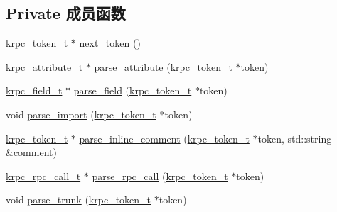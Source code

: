 \subsection*{Private 成员函数}
\begin{DoxyCompactItemize}
\item 
\hyperlink{classkrpc__token__t}{krpc\+\_\+token\+\_\+t} $\ast$ \hyperlink{classkrpc__parser__t_ad8cf136fc4a6adc94564e0bafcaecd83}{next\+\_\+token} ()
\item 
\hyperlink{classkrpc__attribute__t}{krpc\+\_\+attribute\+\_\+t} $\ast$ \hyperlink{classkrpc__parser__t_a898d6df49be083591ea497d616b9902a}{parse\+\_\+attribute} (\hyperlink{classkrpc__token__t}{krpc\+\_\+token\+\_\+t} $\ast$token)
\item 
\hyperlink{classkrpc__field__t}{krpc\+\_\+field\+\_\+t} $\ast$ \hyperlink{classkrpc__parser__t_a6cd1f1c739e0218d49ec8a54a91c17f0}{parse\+\_\+field} (\hyperlink{classkrpc__token__t}{krpc\+\_\+token\+\_\+t} $\ast$token)
\item 
void \hyperlink{classkrpc__parser__t_a1087f9ec985970967482a2872497ad07}{parse\+\_\+import} (\hyperlink{classkrpc__token__t}{krpc\+\_\+token\+\_\+t} $\ast$token)
\item 
\hyperlink{classkrpc__token__t}{krpc\+\_\+token\+\_\+t} $\ast$ \hyperlink{classkrpc__parser__t_a48e708c2f3583d6f0ce649f5be1fb442}{parse\+\_\+inline\+\_\+comment} (\hyperlink{classkrpc__token__t}{krpc\+\_\+token\+\_\+t} $\ast$token, std\+::string \&comment)
\item 
\hyperlink{classkrpc__rpc__call__t}{krpc\+\_\+rpc\+\_\+call\+\_\+t} $\ast$ \hyperlink{classkrpc__parser__t_a9a80b63175c46e43a74c2f72452ba743}{parse\+\_\+rpc\+\_\+call} (\hyperlink{classkrpc__token__t}{krpc\+\_\+token\+\_\+t} $\ast$token)
\item 
void \hyperlink{classkrpc__parser__t_a2f0d89da9389b7dd4edd3749959a637d}{parse\+\_\+trunk} (\hyperlink{classkrpc__token__t}{krpc\+\_\+token\+\_\+t} $\ast$token)
\end{DoxyCompactItemize}
